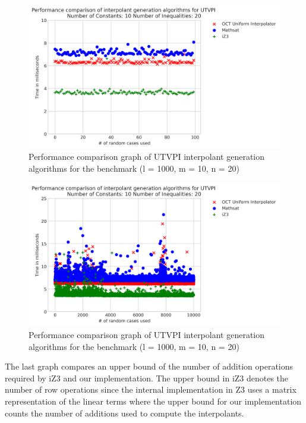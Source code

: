 \begin{figure}[!ht]
  \centering
  \includegraphics[scale=0.6]{figures/octi_performance_graph_10_20_100.png}
  \caption{Performance comparison graph of UTVPI interpolant generation
  algorithms for the benchmark (l = 1000, m = 10, n = 20)} 

  \label{performance_graph_oct_3}
\end{figure}

\begin{figure}[!ht]
  \centering
  \includegraphics[scale=0.6]{figures/octi_performance_graph_10_20_10000.png}
  \caption{Performance comparison graph of UTVPI interpolant generation
  algorithms for the benchmark (l = 1000, m = 10, n = 20)} 

  \label{performance_graph_oct_4}
\end{figure}

The last graph compares an upper bound of the number of addition
operations required by iZ3 and our implementation. The upper
bound in iZ3 denotes the number of row operations since the
internal implementation in Z3 uses a matrix representation
of the linear terms where the upper bound for our implementation
counts the number of additions used to compute the interpolants.


